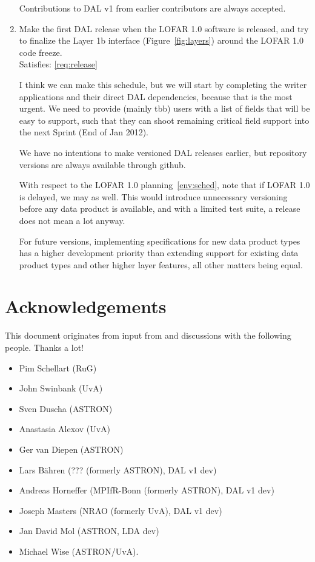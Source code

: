 \documentclass[a4paper,11pt]{article}
\begin{document}
\begin{enumerate}[resume, label=\it D.\arabic{*}]
Contributions to DAL v1 from earlier contributors are always accepted.

\item \label{dsg:release} Make the first DAL release when the LOFAR 1.0 software is released, and try to finalize the Layer 1b interface (Figure~\ref{fig:layers}) around the LOFAR 1.0 code freeze.\\
Satisfies: \ref{req:release}

I think we can make this schedule, but we will start by completing the writer applications and their direct DAL dependencies, because that is the most urgent.
We need to provide (mainly tbb) users with a list of fields that will be easy to support, such that they can shoot remaining critical field support into the next Sprint (End of Jan 2012).

We have no intentions to make versioned DAL releases earlier, but repository versions are always available through github.

With respect to the LOFAR 1.0 planning~\ref{env:sched}, note that if LOFAR 1.0 is delayed, we may as well.
This would introduce unnecessary versioning before any data product is available, and with a limited test suite, a release does not mean a lot anyway.

For future versions, implementing specifications for new data product types has a higher development priority than extending support for existing data product types and other higher layer features, all other matters being equal.

\end{enumerate}


\section{Acknowledgements} \label{sec:acks}
This document originates from input from and discussions with the following people. Thanks a lot!
\begin{itemize}
\itemsep0em
\item Pim Schellart (RuG)
\item John Swinbank (UvA)
\item Sven Duscha (ASTRON)
\item Anastasia Alexov (UvA)
\item Ger van Diepen (ASTRON)
\item Lars B\"ahren (??? (formerly ASTRON), DAL v1 dev)
\item Andreas Horneffer (MPIfR-Bonn (formerly ASTRON), DAL v1 dev)
\item Joseph Masters (NRAO (formerly UvA), DAL v1 dev)
\item Jan David Mol (ASTRON, LDA dev)
\item Michael Wise (ASTRON/UvA).
\end{itemize}
\end{document}
